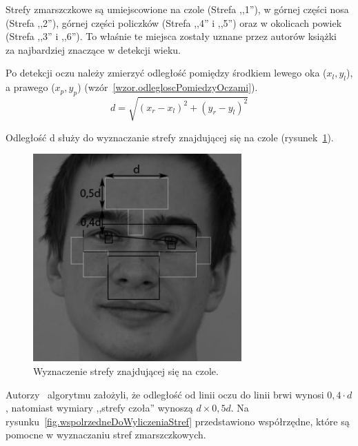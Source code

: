 \documentclass[a4paper,twoside,12pt]{book}
\begin{document}
    Strefy zmarszczkowe są umiejscowione na czole (Strefa ,,1''), w górnej części nosa (Strefa ,,2''), górnej części policzków
    (Strefa ,,4'' i ,,5'') oraz w okolicach powiek (Strefa ,,3'' i ,,6'').
    To właśnie te miejsca zostały uznane przez autorów książki~\cite{wrinkleFeatures} za
    najbardziej znaczące w detekcji wieku.

    Po detekcji oczu należy zmierzyć odległość pomiędzy środkiem lewego oka ($x_{l},y_{l}$),
    a prawego ($x_{p},y_{p}$)
    (wzór~\ref{wzor.odlegloscPomiedzyOczami}).
    \large
    \begin{equation}
        d= \sqrt{\left ( x_{r} - x_{l} \right )^{2}+\left (y_{r} - y_{l}  \right )^{2}}
        \label{wzor.odlegloscPomiedzyOczami}
    \end{equation}
    \normalsize

    Odległość d służy do wyznaczanie strefy znajdującej się na czole (rysunek~\ref{fig.wyznaczenieCzola}).


    \begin{figure}
        \centering
        \includegraphics[width=8cm]{Obrazy/wyliczenieCzolka.jpg}
        \caption{Wyznaczenie strefy znajdującej się na czole.}
        \label{fig.wyznaczenieCzola}
    \end{figure}

    Autorzy~\cite{wrinkleFeatures} algorytmu założyli, że odległość od linii oczu do linii brwi wynosi $0,4 \cdot d$,
    natomiast wymiary ,,strefy czoła'' wynoszą $d \times 0,5d$.
    Na rysunku~\ref{fig.wspolrzedneDoWyliczeniaStref} przedstawiono współrzędne, które są pomocne w wyznaczaniu
    stref zmarszczkowych.
\end{document}
